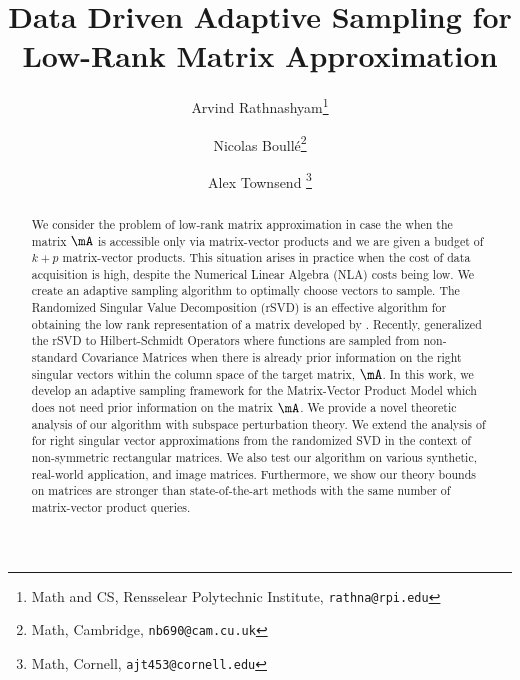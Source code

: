 \documentclass[10pt]{article}
\title{Data Driven Adaptive Sampling for Low-Rank Matrix Approximation}
\author{Arvind Rathnashyam\thanks{Math and CS, Rensselear Polytechnic Institute, \texttt{rathna@rpi.edu}} \and Nicolas Boullé\thanks{Math, Cambridge, \texttt{nb690@cam.cu.uk}} \and Alex Townsend \thanks{Math, Cornell, \texttt{ajt453@cornell.edu}}}
\theoremstyle{plain}
\theoremstyle{definition}
\theoremstyle{remark}
\begin{document}
	
	\maketitle
	






\begin{abstract}%
\normalsize
We consider the problem of low-rank matrix approximation in case the when the matrix $\mA$ is accessible only via matrix-vector products and we are given a budget of $k + p$ matrix-vector products. This situation arises in practice when the cost of data acquisition is high, despite the Numerical Linear Algebra (NLA) costs being low. We create an adaptive sampling algorithm to optimally choose vectors to sample. The Randomized Singular Value Decomposition (rSVD) is an effective algorithm for obtaining the low rank representation of a matrix developed by \cite{halko:2011}. Recently, \cite{boulle:2022} generalized the rSVD to Hilbert-Schmidt Operators where functions are sampled from non-standard Covariance Matrices when there is already prior information on the right singular vectors within the column space of the target matrix, $\mA$. In this work, we develop an adaptive sampling framework for the Matrix-Vector Product Model which does not need prior information on the matrix $\mA$. We provide a novel theoretic analysis of our algorithm with subspace perturbation theory. We extend the analysis of \cite{tzeng:2022} for right singular vector approximations from the randomized SVD in the context of non-symmetric rectangular matrices. We also test our algorithm on various synthetic, real-world application, and image matrices. Furthermore, we show our theory bounds on matrices are stronger than state-of-the-art methods with the same number of matrix-vector product queries. 
\end{abstract}
\clearpage
\tableofcontents
\clearpage
\end{document}
